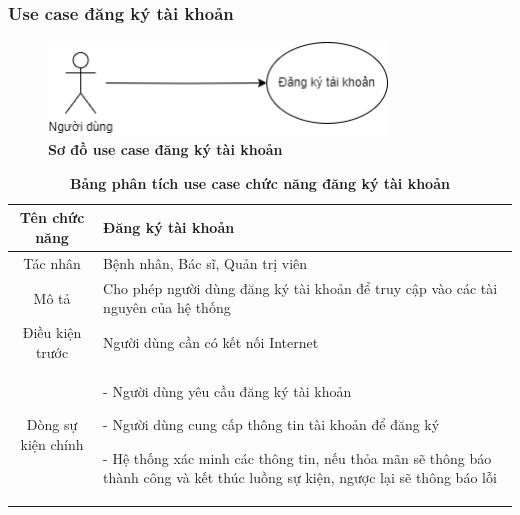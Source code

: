 \subsubsection{Use case đăng ký tài khoản}
  \begin{figure}[H]
    \centering
    \includegraphics[width=9cm,height=2.5cm]{Images/use_case/use_case_register.png}
    \caption[Sơ đồ use case đăng ký tài khoản]{\bfseries \fontsize{12pt}{0pt}
    \selectfont Sơ đồ use case đăng ký tài khoản}
    \label{use_case_register} %
  \end{figure}

  \begin{table}[H]
    \caption{\bfseries \fontsize{12pt}{0pt}\selectfont Bảng phân tích use case chức năng đăng ký tài khoản}
    \centering
    \begin{tabularx}{0.9\textwidth}{|c|X|}
      \hline
      \textbf{Tên chức năng} & \textbf{Đăng ký tài khoản} \\
      \hline
      Tác nhân & Bệnh nhân, Bác sĩ, Quản trị viên \\
      \hline
      Mô tả & Cho phép người dùng đăng ký tài khoản để truy cập vào các tài nguyên của hệ thống 
       \\
      \hline
      Điều kiện trước & Người dùng cần có kết nối Internet \\
      \hline
      Dòng sự kiện chính & 
        - Người dùng yêu cầu đăng ký tài khoản

        - Người dùng cung cấp thông tin tài khoản để đăng ký

        - Hệ thống xác minh các thông tin, nếu thỏa mãn sẽ thông báo thành công và kết thúc luồng sự kiện, ngược lại 
        sẽ thông báo lỗi 
        \\
      \hline
    \end{tabularx}
  \end{table}


